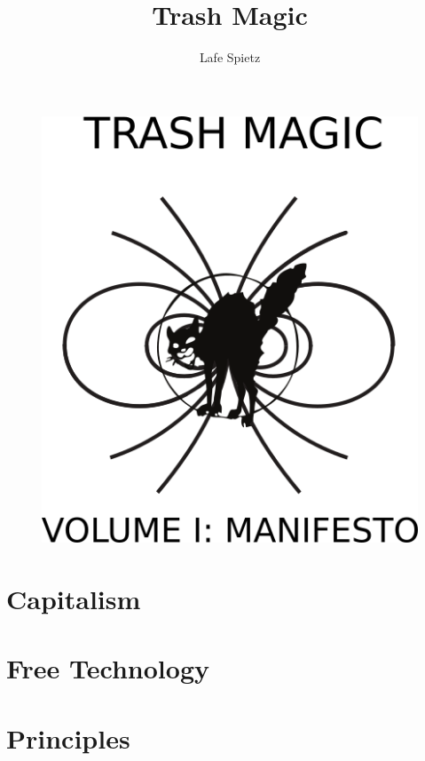 \documentclass[ebook,12pt,openany]{memoir} %
\title{Trash Magic}
\author{Lafe Spietz}
\begin{document}
\frontmatter
\begin{figure}[htbp]
\centering
\includegraphics{images/frontcover.png}
\end{figure}

\clearpage

\clearpage



\newpage
\thispagestyle{empty}
\mbox{}



\maketitle

\tableofcontents

\listoffigures 

\mainmatter
\chapter{Capitalism}


\chapter{Free Technology}


\chapter{Principles}

\end{document}
